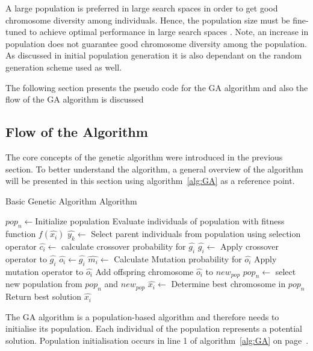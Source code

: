 A large population is preferred in large search spaces in order to get good chromosome diversity among individuals. Hence, the population size must be fine-tuned to achieve optimal performance in large search spaces \cite{AdaptiveSAGA,CompuIntelligenceIntro}. Note, an increase in population does not guarantee good chromosome diversity among the population. As discussed in initial population generation it is also dependant on the random generation scheme used as well. 


The following section presents the pseudo code for the \gls{GA} algorithm and also the flow of the \gls{GA} algorithm is discussed
\subsection{Flow of the Algorithm}
The core concepts of the genetic algorithm were introduced in the previous section. To better understand the algorithm, a general overview of the algorithm will be presented in this section using algorithm~\ref{alg:GA} as a reference point.
\begin{algorithm}[H]
\caption{Basic Genetic Algorithm Algorithm\cite{FamilyGA,AdaptiveSAGA,DistributedHierarchicalGA,SelfAdaptiveGA}}
\label{alg:GA}
	\begin{algorithmic}[1]
		\State $pop_n\leftarrow$Initialize population
    \State Evaluate individuals of population with fitness function $f(\hat{x_i})$
    \State $\hat{y_k} \leftarrow$ Select parent individuals from population using selection operator
		\Repeat
    \State $\hat{c_i} \leftarrow$ calculate crossover probability for $\hat{g_i}$
    \State $\hat{g_i} \leftarrow$ Apply crossover operator to $\hat{g_i}$
				\EndIf
        \State $\hat{o_i} \leftarrow \hat{g_i}$
        \State $\hat{m_i}\leftarrow$ Calculate Mutation probability for $\hat{o_i}$
        \State Apply mutation operator to $\hat{o_i}$
				\EndIf
        \State Add offspring chromosome $\hat{o_i}$ to $new_{pop}$
			\EndFor
		\State $pop_n \leftarrow$ select new population from $pop_n$ and $new_{pop}$
		\EndWhile
    \State $\hat{x_i} \leftarrow$ Determine best chromosome in $pop_n$
    \State Return best solution $\hat{x_i}$
	\end{algorithmic}
\end{algorithm}
The \gls{GA} algorithm is a population-based algorithm and therefore needs to initialise its population. Each individual of the population represents a potential solution. Population initialisation occurs in line 1 of algorithm~\ref{alg:GA} on page~\pageref{alg:GA}. 

